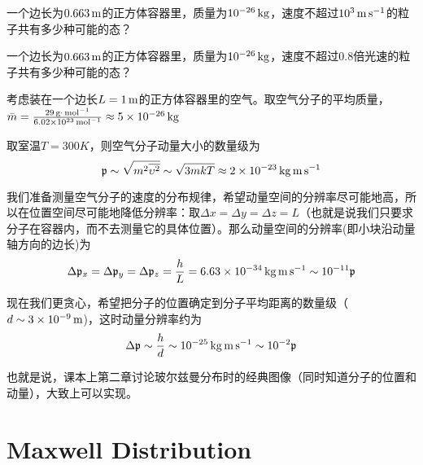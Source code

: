 \documentclass[CJK]{beamer}
\begin{document}
\begin{frame}
\bch
一个边长为$0.663\,\mathrm{m}$的正方体容器里，质量为$10^{-26}\,\mathrm{kg}$，速度不超过$10^3\,\mathrm{m}\,\mathrm{s}^{-1}$的粒子共有多少种可能的态？
\ech
\end{frame}

\begin{frame}
\bch
一个边长为$0.663\,\mathrm{m}$的正方体容器里，质量为$10^{-26}\,\mathrm{kg}$，速度不超过$0.8$倍光速的粒子共有多少种可能的态？
\ech
\end{frame}


\begin{frame}
\bch
考虑装在一个边长$L= 1\,\mathrm{m}$的正方体容器里的空气。取空气分子的平均质量，$\bar{m} = \frac{29\,\mathrm{g}\cdot\,\mathrm{mol}^{-1}}{6.02\times 10^{23}\,\mathrm{mol}^{-1}}\approx 5 \times 10^{-26}\,\mathrm{kg}$

取室温$T=300K$，则空气分子动量大小的数量级为
$${\mathfrak{p}} \sim \sqrt{m^2\overline{\upsilon^2}} \sim \sqrt{3mkT} \approx 2\times 10^{-23} \,\mathrm{kg} \,\mathrm{m}\,\mathrm{s}^{-1} $$

我们准备测量空气分子的速度的分布规律，希望动量空间的分辨率尽可能地高，所以在位置空间尽可能地降低分辨率：取$\Delta x=\Delta y=\Delta z = L$（也就是说我们只要求分子在容器内，而不去测量它的具体位置）。那么动量空间的分辨率(即小块沿动量轴方向的边长)为
$$\Delta {\mathfrak{p}}_x = \Delta {\mathfrak{p}}_y = \Delta {\mathfrak{p}}_z= \frac{h}{L} = 6.63\times 10^{-34} \,\mathrm{kg}\,\mathrm{m}\,\mathrm{s}^{-1} \sim 10^{-11} {\mathfrak{p}}$$

\ech
\end{frame}


\begin{frame}
\bch
现在我们更贪心，希望把分子的位置确定到分子平均距离的数量级（$d\sim 3\times 10^{-9}\,\mathrm{m}$)，这时动量分辨率约为
$$\Delta {\mathfrak{p}} \sim \frac{h}{d} \sim 10^{-25} \,\mathrm{kg}\,\mathrm{m}\,\mathrm{s}^{-1} \sim 10^{-2} {\mathfrak{p}}$$

也就是说，课本上第二章讨论玻尔兹曼分布时的经典图像（同时知道分子的位置和动量），大致上可以实现。

\ech
\end{frame}


\section{Maxwell Distribution}
\end{document}
